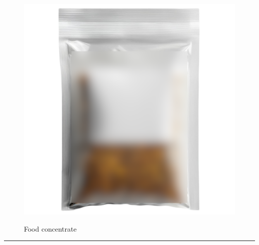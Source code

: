 \documentclass{article}
\begin{document}
    \begin{figure}[H]
        \centering
        \begin{minipage}{0.25\textwidth}
            \centering
            \includegraphics[width=\textwidth]{../SurvivalItemImages/concentrate}
        \end{minipage}\hfill
        \begin{minipage}{0.7\textwidth}
            \centering
            \Large Food concentrate
        \end{minipage}
    \end{figure}
    \vspace{-0.8em}
    \noindent\rule{\textwidth}{0.4pt}
            
    \clearpage
\end{document}
